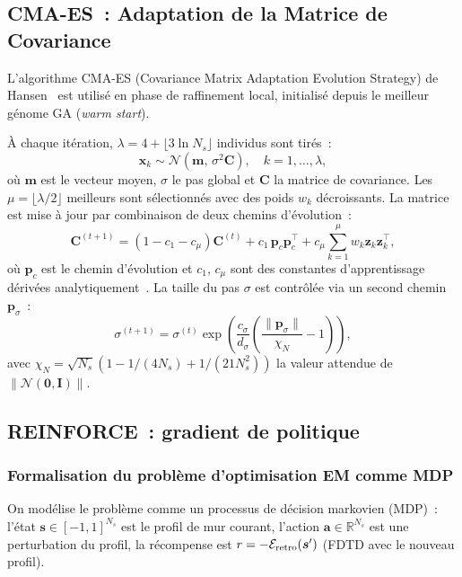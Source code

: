 \documentclass[12pt,a4paper]{article}
\begin{document}
\subsection{CMA-ES~: Adaptation de la Matrice de Covariance}
\label{ssec:cmaes}

L'algorithme CMA-ES (Covariance Matrix Adaptation Evolution Strategy) de
Hansen~\cite{Hansen2001,Hansen2006} est utilisé en phase de raffinement local,
initialisé depuis le meilleur génome GA (\textit{warm start}).

À chaque itération, $\lambda = 4 + \lfloor 3\ln N_s\rfloor$ individus sont tirés~:
\begin{equation}
    \bm{x}_k \sim \mathcal{N}\!\left(\bm{m},\, \sigma^2 \bm{C}\right),
    \quad k = 1, \ldots, \lambda,
    \label{eq:cmaes-sample}
\end{equation}
où $\bm{m}$ est le vecteur moyen, $\sigma$ le pas global et $\bm{C}$ la matrice de
covariance. Les $\mu = \lfloor\lambda/2\rfloor$ meilleurs sont sélectionnés avec des
poids $w_k$ décroissants. La matrice est mise à jour par combinaison de deux chemins
d'évolution~:
\begin{equation}
    \bm{C}^{(t+1)} = (1-c_1-c_\mu)\bm{C}^{(t)}
    + c_1\,\bm{p}_c\bm{p}_c^\top
    + c_\mu\sum_{k=1}^{\mu} w_k \bm{z}_k \bm{z}_k^\top,
    \label{eq:cmaes-cov}
\end{equation}
où $\bm{p}_c$ est le chemin d'évolution et $c_1$, $c_\mu$ sont des constantes
d'apprentissage dérivées analytiquement~\cite{Hansen2001}. La taille du pas $\sigma$
est contrôlée via un second chemin $\bm{p}_\sigma$~:
\begin{equation}
    \sigma^{(t+1)} = \sigma^{(t)}\exp\!\left(
    \frac{c_\sigma}{d_\sigma}\left(\frac{\|\bm{p}_\sigma\|}{\chi_N} - 1\right)\right),
    \label{eq:cmaes-sigma}
\end{equation}
avec $\chi_N = \sqrt{N_s}(1 - 1/(4N_s) + 1/(21N_s^2))$ la valeur attendue de
$\|\mathcal{N}(\bm{0}, \bm{I})\|$.

\subsection{REINFORCE~: gradient de politique}
\label{ssec:rl}

\subsubsection{Formalisation du problème d'optimisation EM comme MDP}

On modélise le problème comme un processus de décision markovien (MDP)~:
l'état $\bm{s} \in [-1,1]^{N_s}$ est le profil de mur courant,
l'action $\bm{a} \in \mathbb{R}^{N_s}$ est une perturbation du profil,
la récompense est $r = -\mathcal{E}_{\rm retro}(\bm{s}')$ (FDTD avec le nouveau profil).
\end{document}
